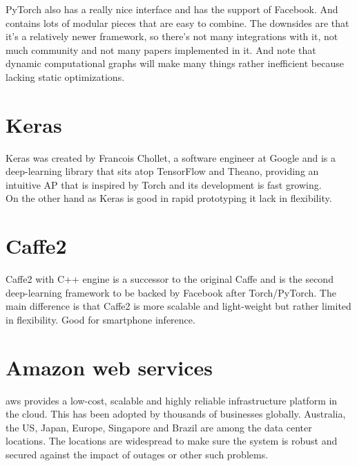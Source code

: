 \documentclass[thesis=M,english]{FITthesis}[2012/06/26]
\begin{document}
PyTorch\cite{ml_pytorch} also has a really nice interface and has the support of Facebook. And contains lots of modular pieces that are easy to combine. The downsides are that it’s a relatively newer framework, so there’s not many integrations with it, not much community and not many papers implemented in it. And note that dynamic computational graphs will make many things rather inefficient because lacking static optimizations.

\section{Keras}

Keras was created by Francois Chollet, a software engineer at Google and is a deep-learning library that sits atop TensorFlow and Theano, providing an intuitive AP that is inspired by Torch and its development is fast growing.\\

On the other hand as Keras\cite{ml_keras} is good in rapid prototyping it lack in flexibility.

\section{Caffe2}

Caffe2\cite{ml_caffe2} with C++ engine is a successor to the original Caffe and is the second deep-learning framework to be backed by Facebook after Torch/PyTorch. The main difference is that Caffe2 is more scalable and light-weight but rather limited in flexibility. Good for smartphone inference.

\section{Amazon web services}

\acrshort{aws} provides a low-cost, scalable and highly reliable infrastructure platform in the cloud. This has been adopted by thousands of businesses globally. Australia, the US, Japan, Europe, Singapore and Brazil are among the data center locations. The locations are widespread to make sure the system is robust and secured against the impact of outages or other such problems.\\
\end{document}
